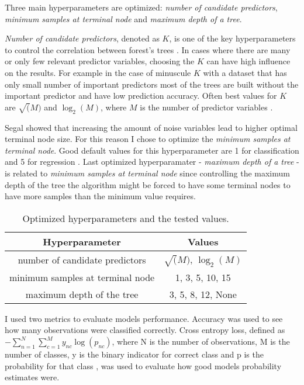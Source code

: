 Three main hyperparameters are optimized: \textit{number of candidate predictors}, \textit{minimum samples at terminal node} and \textit{maximum depth of a tree}.

\textit{Number of candidate predictors}, denoted as $K$, is one of the key hyperparameters to control the correlation between forest's trees \cite{probst2018hyperparameters}.
In cases where there are many or only few relevant predictor variables, choosing the $K$ can have high influence on the results. For example in the case of minuscule $K$ with a dataset that has only small number of important predictors most of the trees are built without the important predictor and have low prediction accuracy. \cite{bernard2009influence} Often best values for $K$ are $\sqrt(M)$ and $\log_2(M)$, where $M$ is the number of predictor variables \cite{bernard2009influence}.

Segal \cite{segal2004machine} showed that increasing the amount of noise variables lead to higher optimal terminal node size. For this reason I chose to optimize the \textit{minimum samples at terminal node}. Good default values for this hyperparameter are 1 for classification and 5 for regression \cite{probst2018hyperparameters}. Last optimized hyperparamater - \textit{maximum depth of a tree} - is related to \textit{minimum samples at terminal node} since controlling the maximum depth of the tree the algorithm might be forced to have some terminal nodes to have more samples than the minimum value requires.

\begin{table}
    \caption{Optimized hyperparameters and the tested values.}
    \begin{tabular}{ | c | c |}
    \hline
    Hyperparameter & Values\\
    \hline
    number of candidate predictors & $\sqrt(M)$, $\log_2(M)$\\
    minimum samples at terminal node & 1, 3, 5, 10, 15\\
    maximum depth of the tree & 3, 5, 8, 12, None\\
    \hline
   \end{tabular}
   \label{tab:hyperparam}
\end{table}

I used two metrics to evaluate models performance. Accuracy was used to see how many observations were classified correctly. Cross entropy loss, defined as $- \sum _ { n = 1 } ^ { N }\sum _ { c = 1 } ^ { M } y _ { nc } \log \left( p _ { nc } \right)$, where N is the number of observations, M is the number of classes, y is the binary indicator for correct class and p is the probability for that class \cite{nasrabadi2007pattern}, was used to evaluate how good models probability estimates were.

